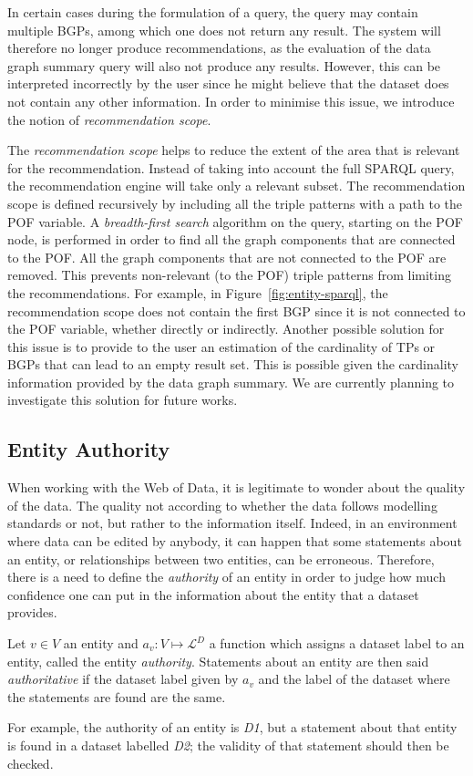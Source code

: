 In certain cases during the formulation of a query, the query may contain multiple BGPs, among which one does not return any result. The system will therefore no longer produce recommendations, as the evaluation of the data graph summary query will also not produce any results. However, this can be interpreted incorrectly by the user since he might believe that the dataset does not contain any other information. In order to minimise this issue, we introduce the notion of \emph{recommendation scope}.

The \emph{recommendation scope} helps to reduce the extent of the area that is relevant for the recommendation. Instead of taking into account the full SPARQL query, the recommendation engine will take only a relevant subset. The recommendation scope is defined recursively by including all the triple patterns with a path to the POF variable. A \emph{breadth-first search} algorithm on the query, starting on the POF node, is performed in order to find all the graph components that are connected to the POF. All the graph components that are not connected to the POF are removed. This prevents non-relevant (to the POF) triple patterns from limiting the recommendations. For example, in Figure~\ref{fig:entity-sparql}, the recommendation scope does not contain the first BGP since it is not connected to the POF variable, whether directly or indirectly. Another possible solution for this issue is to provide to the user an estimation of the cardinality of TPs or BGPs that can lead to an empty result set. This is possible given the cardinality information provided by the data graph summary. We are currently planning to investigate this solution for future works.


\subsection{Entity Authority}

When working with the Web of Data, it is legitimate to wonder about the quality of the data. The quality not according to whether the data follows modelling standards or not, but rather to the information itself. Indeed, in an environment where data can be edited by anybody, it can happen that some statements about an entity, or relationships between two entities, can be erroneous. Therefore, there is a need to define the \emph{authority} of an entity in order to judge how much confidence one can put in the information about the entity that a dataset provides.

\begin{definition}
Let $v \in V$ an entity and $a_v : V \mapsto \mathcal{L}^D$ a function which assigns a dataset label to an entity, called the entity \emph{authority}. Statements about an entity are then said \emph{authoritative} if the dataset label given by $a_v$ and the label of the dataset where the statements are found are the same.
\end{definition}

For example, the authority of an entity is \emph{D1}, but a statement about that entity is found in a dataset labelled \emph{D2}; the validity of that statement should then be checked.
